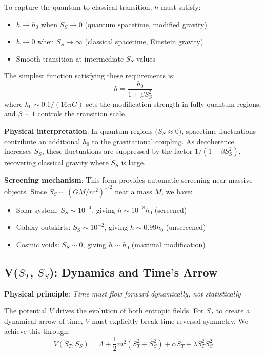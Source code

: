 \documentclass[12pt]{article}
\begin{document}
To capture the quantum-to-classical transition, $h$ must satisfy:
\begin{itemize}
    \item $h \to h_0$ when $S_S \to 0$ (quantum spacetime, modified gravity)
    \item $h \to 0$ when $S_S \to \infty$ (classical spacetime, Einstein gravity)
    \item Smooth transition at intermediate $S_S$ values
\end{itemize}

The simplest function satisfying these requirements is:
\begin{equation}
    h = \frac{h_0}{1 + \beta S_S^2}
\end{equation}
where $h_0 \sim 0.1/(16\pi G)$ sets the modification strength in fully quantum regions, and $\beta \sim 1$ controls the transition scale.

\textbf{Physical interpretation}: In quantum regions ($S_S \approx 0$), spacetime fluctuations contribute an additional $h_0$ to the gravitational coupling. As decoherence increases $S_S$, these fluctuations are suppressed by the factor $1/(1 + \beta S_S^2)$, recovering classical gravity where $S_S$ is large.

\textbf{Screening mechanism}: This form provides automatic screening near massive objects. Since $S_S \sim (GM/rc^2)^{1/2}$ near a mass $M$, we have:
\begin{itemize}
    \item Solar system: $S_S \sim 10^{-4}$, giving $h \sim 10^{-8} h_0$ (screened)
    \item Galaxy outskirts: $S_S \sim 10^{-2}$, giving $h \sim 0.99 h_0$ (unscreened)
    \item Cosmic voids: $S_S \sim 0$, giving $h \sim h_0$ (maximal modification)
\end{itemize}

\subsection{V($S_T$, $S_S$): Dynamics and Time's Arrow}

\textbf{Physical principle}: \emph{Time must flow forward dynamically, not statistically}

The potential $V$ drives the evolution of both entropic fields. For $S_T$ to create a dynamical arrow of time, $V$ must explicitly break time-reversal symmetry. We achieve this through:
\begin{equation}
    V(S_T, S_S) = \Lambda + \frac{1}{2}m^2 (S_T^2 + S_S^2) + \alpha S_T + \lambda S_T^2 S_S^2
\end{equation}
\end{document}
